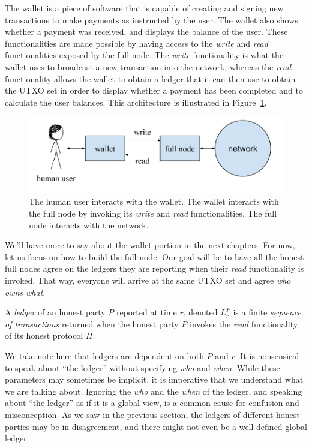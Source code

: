 The wallet is a piece of software that is capable of creating and signing
new transactions to make payments as instructed by the user. The wallet also shows
whether a payment was received, and displays the balance of the user. These functionalities
are made possible by having access to the \emph{write} and \emph{read} functionalities
exposed by the full node. The \emph{write} functionality is what the wallet uses to
broadcast a new transaction into the network, whereas the \emph{read} functionality
allows the wallet to obtain a ledger that it can then use to obtain the UTXO set
in order to display whether a payment has been completed and to calculate the user
balances. This architecture is illustrated in Figure~\ref{fig.wallet-fullnode-architecture}.

\begin{figure}[h]
    \centering
    \includegraphics[width=0.65 \columnwidth,keepaspectratio]{figures/wallet-fullnode-architecture.pdf}
    \caption{The human user interacts with the wallet. The wallet interacts with the full node
    by invoking its \emph{write} and \emph{read} functionalities. The full node interacts with the network.}
    \label{fig.wallet-fullnode-architecture}
\end{figure}

We'll have more to say about the wallet portion in the next chapters. For now,
let us focus on how to build the full node.
Our goal will be to have all the honest full nodes agree on the ledgers they are reporting
when their \emph{read} functionality is invoked. That way, everyone will arrive at the same
UTXO set and agree \emph{who owns what}.

\begin{definition}[Ledger]
    A \emph{ledger} of an honest party $P$ reported at time $r$, denoted $L^P_r$ is
    a finite \emph{sequence of transactions} returned when the honest party $P$ invokes
    the \emph{read} functionality of its honest protocol $\Pi$.
\end{definition}

We take note here that ledgers are dependent on both $P$ and $r$. It is nonsensical to
speak about ``the ledger'' without specifying \emph{who} and \emph{when}. While these
parameters may sometimes be implicit, it is imperative that we understand what we are
talking about. Ignoring the \emph{who} and the \emph{when} of the ledger, and speaking
about ``the ledger'' as if it is a global view, is a common cause for confusion and
misconception. As we saw in the previous section, the ledgers of different honest
parties may be in disagreement, and there might not even be a well-defined global
ledger.


